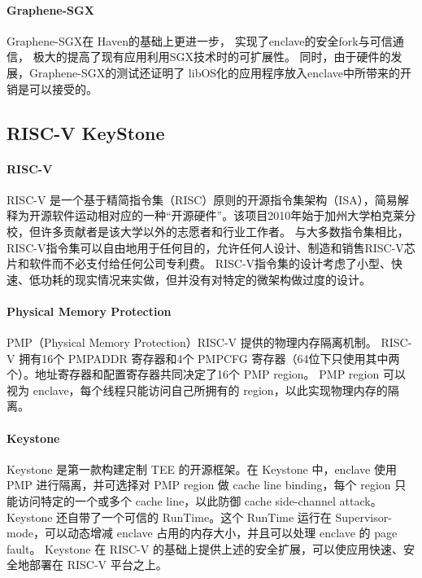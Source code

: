 \paragraph{Graphene-SGX}Graphene-SGX在 Haven的基础上更进一步，
实现了enclave的安全fork与可信通信，
极大的提高了现有应用利用SGX技术时的可扩展性。
同时，由于硬件的发展，Graphene-SGX的测试还证明了
libOS化的应用程序放入enclave中所带来的开销是可以接受的。

\subsection{RISC-V KeyStone}
\paragraph{RISC-V}
RISC-V 是一个基于精简指令集（RISC）原则的开源指令集架构（ISA），简易解释为开源软件运动相对应的一种“开源硬件”。该项目2010年始于加州大学柏克莱分校，但许多贡献者是该大学以外的志愿者和行业工作者。
与大多数指令集相比，RISC-V指令集可以自由地用于任何目的，允许任何人设计、制造和销售RISC-V芯片和软件而不必支付给任何公司专利费。
RISC-V指令集的设计考虑了小型、快速、低功耗的现实情况来实做，但并没有对特定的微架构做过度的设计。
\paragraph{Physical Memory Protection}
PMP（Physical Memory Protection）RISC-V 提供的物理内存隔离机制。
RISC-V 拥有16个 PMPADDR 寄存器和4个 PMPCFG 寄存器（64位下只使用其中两个）。地址寄存器和配置寄存器共同决定了16个 PMP region。
PMP region 可以视为 enclave，每个线程只能访问自己所拥有的 region，以此实现物理内存的隔离。
\paragraph{Keystone}
Keystone 是第一款构建定制 TEE 的开源框架。在 Keystone 中，enclave 使用 PMP 进行隔离，并可选择对 PMP region 做 cache line binding，每个 region 只能访问特定的一个或多个 cache line，以此防御 cache side-channel attack。
Keystone 还自带了一个可信的 RunTime。这个 RunTime 运行在 Supervisor-mode，可以动态增减 enclave 占用的内存大小，并且可以处理 enclave 的 page fault。
Keystone 在 RISC-V 的基础上提供上述的安全扩展，可以使应用快速、安全地部署在 RISC-V 平台之上。
